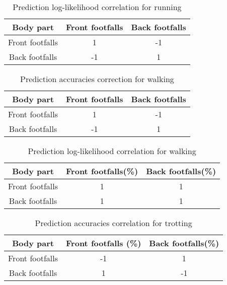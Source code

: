 \begin{table}[h!] 
	\centering
	\begin{tabular}{ |c|c|c|} 	
		\hline	
		\textbf{Body part} & \textbf{Front footfalls} &  \textbf{Back footfalls}\\ 
		\hline
		Front footfalls & 1 & -1\\ 
		\hline
		Back footfalls & -1 & 1 \\ 
		\hline	   	
	\end{tabular}
	\caption{Prediction log-likelihood correlation for running}
	\label{tab:front-back-run-log-corr}
\end{table}


\begin{table}[h!] 
	\centering
	\begin{tabular}{ |c|c|c|} 	
		\hline	
		\textbf{Body part} & \textbf{Front footfalls} &  \textbf{Back footfalls}\\ 
		\hline
		Front footfalls &  1 & -1\\ 
		\hline
		Back footfalls & -1 & 1 \\ 
		\hline	   	
	\end{tabular}
	\caption{Prediction accuracies correction for walking}
	\label{tab:front-back-walk-acc-corr}
\end{table}

\begin{table}[h!] 
	\centering
	\begin{tabular}{ |c|c|c|} 	
		\hline	
		\textbf{Body part} & \textbf{Front footfalls(\%)} &  \textbf{Back footfalls(\%)}\\ 
		\hline
		Front footfalls & 1 & 1\\ 
		\hline
		Back footfalls & 1 & 1\\ 
		\hline	   	
	\end{tabular}
	\caption{Prediction log-likelihood correlation for walking}
	\label{tab:front-back-walk-log-corr}
\end{table}


\begin{table}[h!] 
	\centering
	\begin{tabular}{ |c|c|c|} 	
		\hline	
		\textbf{Body part} & \textbf{Front footfalls (\%)} &  \textbf{Back footfalls(\%)}\\ 
		\hline
		Front footfalls &  -1 & 1\\ 
		\hline
		Back footfalls & 1 & -1 \\ 
		\hline	   	
	\end{tabular}
	\caption{Prediction accuracies correlation for trotting}
	\label{tab:front-back-trot-acc-corr}
\end{table}


